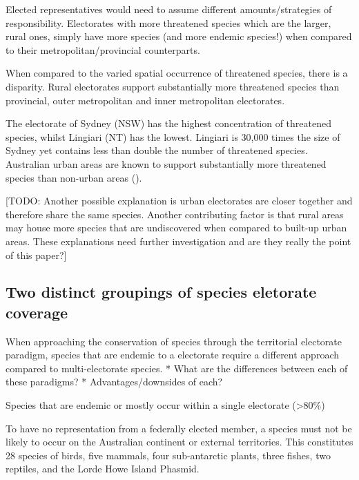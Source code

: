 \documentclass[a4paper,11pt]{article}
\begin{document}
Elected representatives would need to assume different amounts/strategies of responsibility. Electorates with more threatened species which are the larger, rural ones, simply have more species (and more endemic species!) when compared to their metropolitan/provincial counterparts. 

When compared to the varied spatial occurrence of threatened species, there is a disparity. Rural electorates support substantially more threatened species than provincial, outer metropolitan and inner metropolitan electorates. 

The electorate of Sydney (NSW) has the highest concentration of threatened species, whilst Lingiari (NT) has the lowest. Lingiari is 30,000 times the size of Sydney yet contains less than double the number of threatened species. Australian urban areas are known to support substantially more threatened species than non-urban areas (\cite{ivesCitiesAreHotspots2016, soanesConservationOpportunitiesThreatened2020}). 

[TODO: Another possible explanation is urban electorates are closer together and therefore share the same species. Another contributing factor is that rural areas may house more species that are undiscovered when compared to built-up urban areas. These explanations need further investigation and are they really the point of this paper?]

\subsection{Two distinct groupings of species eletorate coverage}
When approaching the conservation of species through the territorial electorate paradigm, species that are endemic to a electorate require a different approach compared to multi-electorate species.
* What are the differences between each of these paradigms?
* Advantages/downsides of each?

Species that are endemic or mostly occur within a single electorate (>80\%)



To have no representation from a federally elected member, a species must not be likely to occur on the Australian continent or external territories. This constitutes 28 species of birds, five mammals, four sub-antarctic plants, three fishes, two reptiles, and the Lorde Howe Island Phasmid. 
\end{document}
